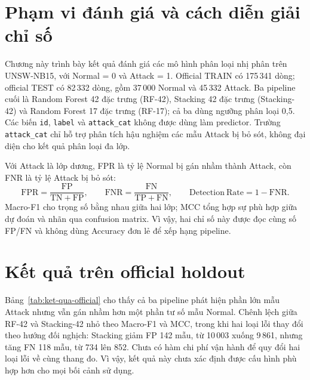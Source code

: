 \section{Phạm vi đánh giá và cách diễn giải chỉ số}
\label{sec:pham-vi-ket-qua}

Chương này trình bày kết quả đánh giá các mô hình phân loại nhị phân trên UNSW-NB15, với Normal = 0 và Attack = 1. Official TRAIN có 175\,341 dòng; official TEST có 82\,332 dòng, gồm 37\,000 Normal và 45\,332 Attack. Ba pipeline cuối là Random Forest 42 đặc trưng (RF-42), Stacking 42 đặc trưng (Stacking-42) và Random Forest 17 đặc trưng (RF-17); cả ba dùng ngưỡng phân loại 0,5. Các biến \texttt{id}, \texttt{label} và \texttt{attack\_cat} không được dùng làm predictor. Trường \texttt{attack\_cat} chỉ hỗ trợ phân tích hậu nghiệm các mẫu Attack bị bỏ sót, không đại diện cho kết quả phân loại đa lớp.

Với Attack là lớp dương, FPR là tỷ lệ Normal bị gán nhầm thành Attack, còn FNR là tỷ lệ Attack bị bỏ sót:
\begin{equation}
  \mathrm{FPR}=\frac{\mathrm{FP}}{\mathrm{TN}+\mathrm{FP}},
  \qquad
  \mathrm{FNR}=\frac{\mathrm{FN}}{\mathrm{TP}+\mathrm{FN}},
  \qquad
  \mathrm{Detection\ Rate}=1-\mathrm{FNR}.
\end{equation}
Macro-F1 cho trọng số bằng nhau giữa hai lớp; MCC tổng hợp sự phù hợp giữa dự đoán và nhãn qua confusion matrix. Vì vậy, hai chỉ số này được đọc cùng số FP/FN và không dùng Accuracy đơn lẻ để xếp hạng pipeline.

\section{Kết quả trên official holdout}
\label{sec:ket-qua-official}

Bảng~\ref{tab:ket-qua-official} cho thấy cả ba pipeline phát hiện phần lớn mẫu Attack nhưng vẫn gán nhầm hơn một phần tư số mẫu Normal. Chênh lệch giữa RF-42 và Stacking-42 nhỏ theo Macro-F1 và MCC, trong khi hai loại lỗi thay đổi theo hướng đối nghịch: Stacking giảm FP 142 mẫu, từ 10\,003 xuống 9\,861, nhưng tăng FN 118 mẫu, từ 734 lên 852. Chưa có hàm chi phí vận hành để quy đổi hai loại lỗi về cùng thang đo. Vì vậy, kết quả này chưa xác định được cấu hình phù hợp hơn cho mọi bối cảnh sử dụng.

